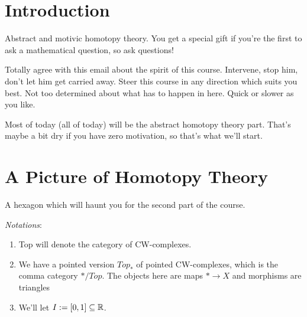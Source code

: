 \documentclass[../MH_Total.tex]{subfiles}
\begin{document}
\section{Introduction}
Abstract and motivic homotopy theory. You get a special gift if you're the first to ask a mathematical question, so ask questions!

Totally agree with this email about the spirit of this course. Intervene, stop him, don't let him get carried away. Steer this course in any direction which suits you best. Not too determined about what has to happen in here. Quick or slower as you like.

Most of today (all of today) will be the abstract homotopy theory part. That's maybe a bit dry if you have zero motivation, so that's what we'll start.

\section{A Picture of Homotopy Theory}
A hexagon which will haunt you for the second part of the course. 

\emph{Notations}: 
\begin{enumerate}
	\item Top will denote the category of CW-complexes.
	\item We have a pointed version $Top_*$ of pointed CW-complexes, which is the comma category $*/Top$. The objects  here are maps $* \to X$ and morphisms are triangles
	\begin{center}
	\end{center}
	\item We'll let $I := [0,1] \subseteq \mathbb{R}$.
\end{enumerate}
\end{document}
